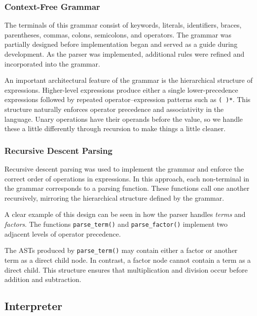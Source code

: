 \documentclass[12pt,a4paper]{article}
\begin{document}
\subsubsection{Context-Free Grammar}



The terminals of this grammar consist of keywords, literals, identifiers, braces, parentheses, commas, colons, semicolons, and operators. The grammar was partially designed before implementation began and served as a guide during development. As the parser was implemented, additional rules were refined and incorporated into the grammar.

An important architectural feature of the grammar is the hierarchical structure of expressions. 
Higher-level expressions produce either a single lower-precedence expressions followed by repeated operator–expression patterns such as \texttt{( )*}. This structure naturally enforces operator precedence and associativity in the language. Unary operations have their operands before the value, so we handle these a little differently through recursion to make things a little cleaner.

\subsubsection{Recursive Descent Parsing}

Recursive descent parsing was used to implement the grammar and enforce the correct order of operations in expressions. In this approach, each non-terminal in the grammar corresponds to a parsing function. These functions call one another recursively, mirroring the hierarchical structure defined by the grammar.

A clear example of this design can be seen in how the parser handles \textit{terms} and \textit{factors}. The functions \texttt{parse_term()} and \texttt{parse_factor()} implement two adjacent levels of operator precedence.




\newpage

The ASTs produced by \texttt{parse_term()} may contain either a factor or another term as a direct child node. In contrast, a factor node cannot contain a term as a direct child. This structure ensures that multiplication and division occur before addition and subtraction.



\subsection{Interpreter}
\end{document}
